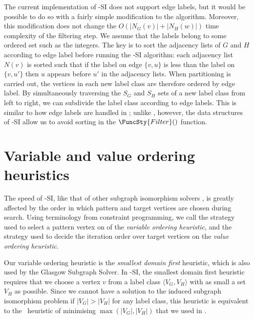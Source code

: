 The current implementation of \McSplit-SI does not support edge labels, but it
would be possible to do so with a fairly simple modification to the algorithm.
Moreover, this modification does not change the
$O(|N_G(v)| + |N_H(w)|)$ time complexity of the filtering step.  We assume that
the labels belong to some ordered set such as the integers.  The key is to sort
the adjacency lists of $G$ and $H$ according to edge label before running the \McSplit-SI
algorithm: each adjacency list $N(v)$ is sorted such that if the label on edge
$\{v,u\}$ is less than the label on $\{v,u'\}$ then $u$ appears before $u'$ in
the adjacency lists.  When partitioning is carried out, the
vertices in each new label class are therefore ordered by edge label.
By simultaneously
traversing the $S_G$ and $S_H$ sets of a new label class from left to right, we
can subdivide the label class according to edge labels.  This is similar to how
edge labels are handled in \McSplit; unlike \McSplit, however, the
data structures of \McSplit-SI allow us to avoid sorting in the $\FuncSty{Filter}()$
function.

\section{Variable and value ordering heuristics}\label{sec:mcsplit-si-heuristics}

The speed of \McSplit-SI, like that of other subgraph isomorphism solvers
\citep{DBLP:journals/tcbb/BonniciG17,DBLP:journals/jair/McCreeshPST18},
is greatly affected by the order
in which pattern and target vertices are chosen during search.
Using terminology from constraint programming, we call the strategy
used to select a pattern vertex on  of
 the \emph{variable ordering heuristic}, and the
strategy used to decide the iteration order over target vertices on
 the \emph{value ordering heuristic}.

Our variable ordering heuristic is the \emph{smallest domain first} heuristic,
which is also used by the Glasgow Subgraph Solver.
In \McSplit-SI, the smallest domain first heuristic requires
that we choose a vertex $v$ from a label class $\langle V_G, V_H \rangle$ with
as small a set $V_H$ as possible.  Since we cannot have a solution
to the induced subgraph isomorphism problem
if $|V_G|>|V_H|$ for any label class, this heuristic is equivalent
to the \McSplit\ heuristic of minimising $\max(|V_G|,|V_H|)$ that we
used in .

